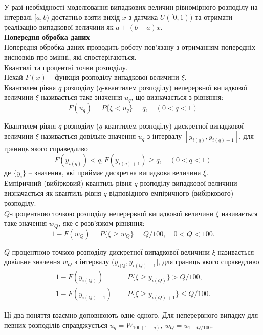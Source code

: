 У разі необхідності моделювання випадкових величин рівномірного розподілу на інтервалі $[a, b)$ достатньо взяти вихід $x$ з датчика $U([0,1))$ та отримати реалізацію випадкової величини як $a + (b - a) x$. \\

\textbf{Попередня обробка даних} \\

Попередня обробка даних проводить роботу пов'язану з отриманням попередніх висновків про змінні, які спостерігаються. \\

Квантилі та процентні точки розподілу. \\

Нехай $F(x)$ -- функція розподілу випадкової величини $\xi$. \\

Квантилем рівня $q$ розподілу ($q$-квантилем розподілу) неперервної випадкової величини $\xi$ називається таке значення $u_q$, що визначається з рівняння:
\[ F(u_q) = P \{ \xi < u_q\} = q, \quad (0 < q < 1) \]

Квантилем рівня $q$ розподілу ($q$-квантилем розподілу) дискретної випадкової величини $\xi$ називається довільне значення $u_q$ з інтервалу $[y_{i(q)}, y_{i(q) + 1}]$, для границь якого справедливо
\[ F(y_{i(q)}) < q, F(y_{i(q) + 1}) \ge q, \quad (0 < q < 1) \]
де $\{y_i\}$ -- значення, які приймає дискретна випадкова величина $\xi$. \\

Емпіричний (вибірковий) квантиль рівня $q$ розподілу випадкової величини визначається як квантиль рівня $q$ відповідного емпіричного (вибіркового) розподілу. \\

$Q$-процентною точкою розподілу неперервної випадкової величини $\xi$ називається таке значення $w_Q$, яке є розв'язком рівняння:
\[ 1 - F(w_Q) = P \{ \xi \ge w_Q \} = Q / 100, \quad 0 < Q < 100. \]

$Q$-процентною точкою розподілу дискретної випадкової величини $\xi$ називається довільне значення $w_Q$ з інтервалу $(y_{i(Q}, y_{i(Q) + 1}]$, для границь якого справедливо
\begin{align*}
    1 - F(y_{i(Q)}) &= P \{ \xi \ge y_{i(Q)} \} > Q / 100, \\
    1 - F(y_{i(Q) + 1}) &= P \{ \xi \ge y_{i(Q) + 1} \} \le Q / 100.
\end{align*} 

Ці два поняття взаємно доповнюють одне одного. Для неперервного випадку для певних розподілів справджується $u_q = W_{100 (1 - q)}$, $w_Q = u_{1 - Q / 100}$. \\

